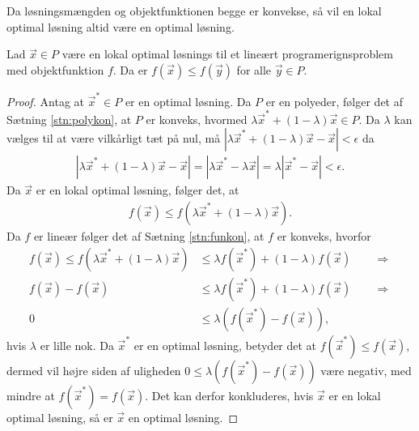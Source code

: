 Da løsningsmængden og objektfunktionen begge er konvekse, så vil en lokal optimal løsning altid være en optimal løsning.
\begin{stn}
Lad $\vec{x} \in P$ være en lokal optimal løsnings til et lineært programerignsproblem  med objektfunktion $f$.
Da er  $f(\vec{x}) \leq f(\vec{y})$ for alle $\vec{y} \in P$.
\end{stn}
\begin{proof}
Antag at $\vec{x}^* \in P$ er en optimal løsning.
Da $P$ er en polyeder, følger det af Sætning \ref{stn:polykon}, at $P$ er konveks, hvormed $\lambda \vec{x}^* + (1-\lambda)\vec{x} \in P$. 
Da $\lambda$ kan vælges til at være vilkårligt tæt på nul, må $|\lambda \vec{x}^* + (1-\lambda)\vec{x} - \vec{x}| < \epsilon$ da
\begin{align*}
 |\lambda \vec{x}^* + (1-\lambda)\vec{x} - \vec{x}| = | \lambda \vec{x}^* - \lambda\vec{x}| = \lambda|\vec{x}^* - \vec{x}| < \epsilon.
\end{align*}
Da $\vec{x}$ er en lokal optimal løsning, følger det, at
\begin{align*}
f(\vec{x}) \leq f(\lambda \vec{x}^* + (1-\lambda)\vec{x}).
\end{align*}
Da $f$ er lineær følger det af Sætning \ref{stn:funkon}, at $f$ er konveks, hvorfor
\begin{align*}
f(\vec{x}) \leq f(\lambda \vec{x}^* + (1-\lambda)\vec{x}) &\leq \lambda f(\vec{x}^*) + (1-\lambda)f(\vec{x}) \qquad \Rightarrow
\\ f(\vec{x}) - f(\vec{x}) &\leq \lambda f(\vec{x}^*) + (1-\lambda)f(\vec{x}) \qquad \Rightarrow
\\ 0 & \leq \lambda( f(\vec{x}^*) - f(\vec{x})),
\end{align*}
hvis $\lambda$ er lille nok.
Da $\vec{x}^*$ er en optimal løsning, betyder det at $f(\vec{x}^*) \leq f(\vec{x})$, dermed vil højre siden af uligheden $0 \leq \lambda( f(\vec{x}^*) - f(\vec{x}))$ være negativ, med mindre at $f(\vec{x}^*) =f(\vec{x})$. 
Det kan derfor konkluderes, hvis $\vec{x}$ er en lokal optimal løsning, så er $\vec{x}$ en optimal løsning.
\end{proof}



